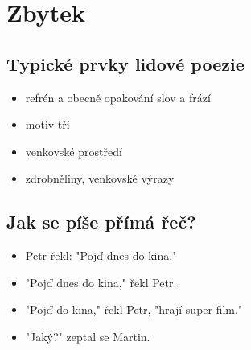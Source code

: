\newpage
\section{Zbytek}
\subsection{Typické prvky lidové poezie}
\begin{itemize}
\item refrén a obecně opakování slov a frází
\item motiv tří
\item venkovské prostředí
\item zdrobněliny, venkovské výrazy
\end{itemize}

\subsection{Jak se píše přímá řeč?}
\begin{itemize}
\item Petr řekl: "Pojď dnes do kina."
\item "Pojď dnes do kina," řekl Petr.
\item "Pojď do kina," řekl Petr, "hrají super film."
\item "Jaký?" zeptal se Martin.
\end{itemize}

